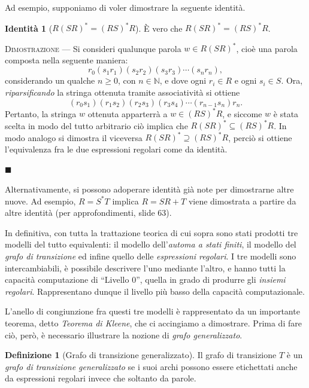 \documentclass[10pt]{\classname}
\theoremstyle{definition}
\newtheorem{definizione}{Definizione}[section]
\theoremstyle{definition}
\newtheorem{identita}{Identità}[section]
\begin{document}
Ad esempio, supponiamo di voler dimostrare la seguente identità.

\begin{identita}[$R(SR)^* = (RS)^* R$]
    È vero che $R(SR)^* = (RS)^* R$.
\end{identita}

\textsc{Dimostrazione } --- Si consideri qualunque parola $w \in R(SR)^*$, cioè
una parola composta nella seguente maniera:
$$r_0(s_1r_1)(s_2r_2)(s_3r_3)\cdots(s_nr_n),$$ considerando un qualche $n \geq
0$, con $n \in \mathbb{N}$, e dove ogni $r_i \in R$ e ogni $s_i \in S$. Ora,
\emph{riparsificando} la stringa ottenuta tramite associatività si ottiene
$$(r_0s_1)(r_1s_2)(r_2s_3)(r_3s_4)\cdots(r_{n-1}s_n)r_n.$$ Pertanto, la stringa
$w$ ottenuta apparterrà a $w \in (RS)^*R$, e siccome $w$ è stata scelta in modo
del tutto arbitrario ciò implica che $R(SR)^* \subseteq (RS)^* R$. In modo
analogo si dimostra il viceversa $R(SR)^* \supseteq (RS)^* R$, perciò si
ottiene l'equivalenza fra le due espressioni regolari come da identità.

\begin{flushright}
$\blacksquare$
\end{flushright}

Alternativamente, si possono adoperare identità già note per dimostrarne altre
nuove. Ad esempio, $R = S^* T$ implica $R = SR + T$ viene dimostrata a partire
da altre identità (per approfondimenti, slide 63).

In definitiva, con tutta la trattazione teorica di cui sopra sono stati
prodotti tre modelli del tutto equivalenti: il modello dell'\emph{automa a
stati finiti}, il modello del \emph{grafo di transizione} ed infine quello
delle \emph{espressioni regolari}. I tre modelli sono intercambiabili, è
possibile descrivere l'uno mediante l'altro, e hanno tutti la capacità
computazione di ``Livello 0'', quella in grado di produrre gli \emph{insiemi
regolari}. Rappresentano dunque il livello più basso della capacità
computazionale.

L'anello di congiunzione fra questi tre modelli è rappresentato da un
importante teorema, detto \emph{Teorema di Kleene}, che ci accingiamo a
dimostrare. Prima di fare ciò, però, è necessario illustrare la nozione di
\emph{grafo generalizzato}.

\begin{definizione}[Grafo di transizione generalizzato]
    Il grafo di transizione $T$ è un \emph{grafo di transizione generalizzato} se i suoi archi possono essere
    etichettati anche da espressioni regolari invece che soltanto da parole.
\end{definizione}
\end{document}
